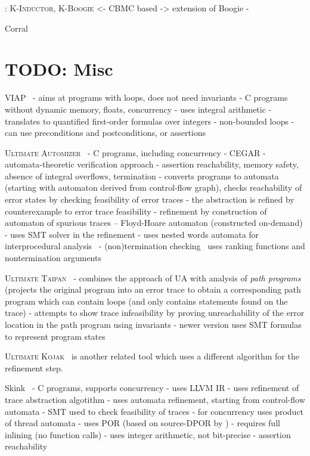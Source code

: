 : \textsc{K-Inductor}, \textsc{K-Boogie}
<- CBMC based
-> extension of Boogie
- 

Corral

\section{TODO: Misc}

VIAP~
- aims at programs with loops, does not need invariants
- C programs without dynamic memory, floats, concurrency
- uses integral arithmetic
- translates to quantified first-order formulas over integers
- non-bounded loops
- can use preconditions and postconditions, or assertions

\textsc{Ultimate Automizer}~
- C programs, including concurrency
- CEGAR
- automata-theoretic verification approach
- assertion reachability, memory safety, absence of integral overflows, termination
- converts programs to automata (starting with automaton derived from control-flow graph), checks reachability of error states by checking feasibility of error traces
  - the abstraction is refined by counterexample to error trace feasibility
  - refinement by construction of automaton of spurious traces -- Floyd-Hoare automaton (constructed on-demand)
  - uses SMT solver in the refinement
- uses nested words automata for interprocedural analysis~\cite{TODO}
- (non)termination checking~ uses ranking functions and nontermination arguments

\textsc{Ultimate Taipan}~
- combines the approach of UA with analysis of \emph{path programs} (projects the original program into an error trace to obtain a corresponding path program which can contain loops (and only contains statements found on the trace)
- attempts to show trace infeasibility by proving unreachability of the error location in the path program using invariants
- newer version uses SMT formulas to represent program states

\textsc{Ultimate Kojak}~ is another related tool which uses a different algorithm for the refinement step.

Skink~
- C programs, supports concurrency
- uses LLVM IR
- uses refinement of trace abstraction algotithm 
  - uses automata refinement, starting from control-flow automata
  - SMT used to check feasibility of traces
  - for concurrency uses product of thread automata
    - uses POR (based on source-DPOR by )
- requires full inlining (no function calls)
- uses integer arithmetic, not bit-precise
- assertion reachability

